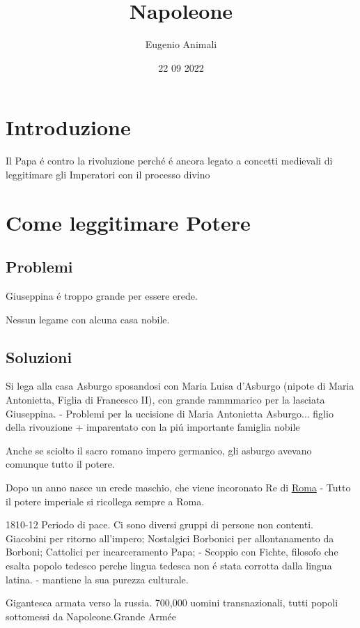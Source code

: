 \documentclass{article}
\title{Napoleone}
\author{Eugenio Animali}
\date{22 09 2022}
\begin{document}
\maketitle

\section{Introduzione}

Il Papa é contro la rivoluzione perché é ancora legato a concetti medievali di leggitimare gli Imperatori con il processo divino

\section*{Come leggitimare Potere}

\subsection*{Problemi}

Giuseppina é troppo grande per essere erede.

Nessun legame con alcuna casa nobile.

\subsection*{Soluzioni}

Si lega alla casa Asburgo sposandosi con Maria Luisa d'Asburgo (nipote di Maria Antonietta, Figlia di Francesco II), con grande rammmarico per la lasciata Giuseppina. - Problemi per la uccisione di Maria Antonietta Asburgo... \color{red}figlio della rivouzione + imparentato con la piú importante famiglia nobile\color{white}

Anche se sciolto il sacro romano impero germanico, gli asburgo avevano comunque tutto il potere.

Dopo un anno nasce un erede maschio, che viene incoronato Re di \underline{Roma} - Tutto il potere imperiale si ricollega sempre a Roma.

1810-12 Periodo di pace. Ci sono diversi gruppi di persone non contenti. Giacobini per ritorno all'impero; Nostalgici Borbonici per allontanamento da Borboni; Cattolici per incarceramento Papa; - Scoppio con Fichte, filosofo che esalta popolo tedesco perche lingua tedesca non é stata corrotta dalla lingua latina. - mantiene la sua purezza culturale.

Gigantesca armata verso la russia. 700,000 uomini transnazionali, tutti popoli sottomessi da Napoleone.Grande Armée
\end{document}
